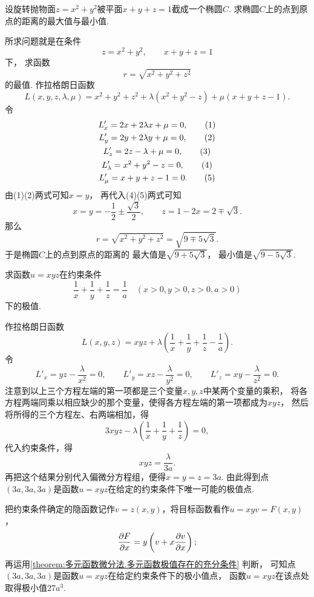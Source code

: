 \begin{example}
设旋转抛物面\(z = x^2 + y^2\)被平面\(x + y + z = 1\)截成一个椭圆\(C\).
求椭圆\(C\)上的点到原点的距离的最大值与最小值.
\begin{solution}
所求问题就是在条件\[
	z = x^2 + y^2,
	\qquad
	x + y + z = 1
\]下，
求函数\[
	r = \sqrt{x^2+y^2+z^2}
\]的最值.
作拉格朗日函数\[
	L(x,y,z,\lambda,\mu)
	= x^2+y^2+z^2 + \lambda(x^2+y^2-z) + \mu(x+y+z-1).
\]
令\begin{gather*}
	L'_x = 2x + 2\lambda x + \mu = 0, \tag1 \\
	L'_y = 2y + 2\lambda y + \mu = 0, \tag2 \\
	L'_z = 2z - \lambda + \mu = 0, \tag3 \\
	L'_\lambda = x^2+y^2-z = 0, \tag4 \\
	L'_\mu = x+y+z-1 = 0. \tag5
\end{gather*}
由(1)(2)两式可知\(x = y\)，
再代入(4)(5)两式可知\[
	x = y = -\frac12 \pm \frac{\sqrt3}2,
	\qquad
	z = 1-2x = 2 \mp \sqrt3.
\]
那么\[
	r = \sqrt{x^2+y^2+z^2}
	= \sqrt{9 \mp 5\sqrt3}.
\]
于是椭圆\(C\)上的点到原点的距离的
最大值是\(\sqrt{9+5\sqrt3}\)，
最小值是\(\sqrt{9-5\sqrt3}\).
\end{solution}
\end{example}

\begin{example}
求函数\(u=xyz\)在约束条件\[
	\frac{1}{x}+\frac{1}{y}+\frac{1}{z}=\frac{1}{a}
	\quad(x>0,y>0,z>0,a>0)
\]下的极值.
\begin{solution}
作拉格朗日函数\[
	L(x,y,z) = xyz+\lambda\left(\frac{1}{x}+\frac{1}{y}+\frac{1}{z}-\frac{1}{a}\right).
\]
令\[
	L'_x = yz - \frac{\lambda}{x^2} = 0,
	\qquad
	L'_y = xz - \frac{\lambda}{y^2} = 0,
	\qquad
	L'_z = xy - \frac{\lambda}{z^2} = 0.
\]
注意到以上三个方程左端的第一项都是三个变量\(x,y,z\)中某两个变量的乘积，
将各方程两端同乘以相应缺少的那个变量，使得各方程左端的第一项都成为\(xyz\)，
然后将所得的三个方程左、右两端相加，得\[
	3xyz - \lambda\left(\frac{1}{x}+\frac{1}{y}+\frac{1}{z}\right) = 0,
\]
代入约束条件，得\[
	xyz = \frac{\lambda}{3a}.
\]
再把这个结果分别代入偏微分方程组，便得\(x = y = z = 3a\).
由此得到点\((3a,3a,3a)\)是函数\(u = xyz\)在给定的约束条件下唯一可能的极值点.

把约束条件确定的隐函数记作\(v = z(x,y)\)，将目标函数看作\(u = xyv = F(x,y)\)，\[
\pdv{F}{x} = y\left(v+x\pdv{v}{x}\right);
\]再运用\cref{theorem:多元函数微分法.多元函数极值存在的充分条件} 判断，
可知点\((3a,3a,3a)\)是函数\(u = xyz\)在给定约束条件下的极小值点，
函数\(u = xyz\)在该点处取得极小值\(27a^3\).
\end{solution}
\end{example}

